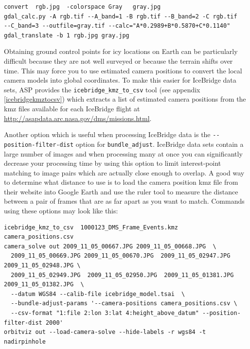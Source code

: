 \begin{verbatim}
convert  rgb.jpg  -colorspace Gray   gray.jpg
gdal_calc.py -A rgb.tif --A_band=1 -B rgb.tif --B_band=2 -C rgb.tif
--C_band=3 --outfile=gray.tif --calc="A*0.2989+B*0.5870+C*0.1140"
gdal_translate -b 1 rgb.jpg gray.jpg
\end{verbatim}

Obtaining ground control points for icy locations on Earth can be particularly difficult because
they are not well surveyed or because the terrain shifts over time.
This may force you to use estimated camera positions
to convert the local camera models into global coordinates.
To make this easier for IceBridge data sets, ASP provides the
\texttt{icebridge\_kmz\_to\_csv} tool (see appendix \ref{icebridgekmztocsv})
which extracts a list of estimated camera positions from the kmz files available for each
IceBridge flight at \url{http://asapdata.arc.nasa.gov/dms/missions.html}.

Another option which is useful when processing IceBridge data is the
\texttt{-\/-position-filter-dist} option for \texttt{bundle\_adjust}.  IceBridge data sets contain
a large number of images and when processing many at once you can significantly decrease
your processing time by using this option to limit interest-point matching to image pairs
which are actually close enough to overlap.  A good way to determine what distance to use
is to load the camera position kmz file from their website into Google Earth and use the
ruler tool to measure the distance between a pair of frames that are as far apart as you
want to match. Commands using these options may look like this:

\begin{verbatim}
icebridge_kmz_to_csv  1000123_DMS_Frame_Events.kmz  camera_positions.csv
camera_solve out 2009_11_05_00667.JPG 2009_11_05_00668.JPG  \
  2009_11_05_00669.JPG 2009_11_05_00670.JPG  2009_11_05_02947.JPG 2009_11_05_02948.JPG \
  2009_11_05_02949.JPG  2009_11_05_02950.JPG  2009_11_05_01381.JPG 2009_11_05_01382.JPG  \
  --datum WGS84 --calib-file icebridge_model.tsai  \
  --bundle-adjust-params '--camera-positions camera_positions.csv \
  --csv-format "1:file 2:lon 3:lat 4:height_above_datum" --position-filter-dist 2000'
orbitviz out --load-camera-solve --hide-labels -r wgs84 -t nadirpinhole
\end{verbatim}


